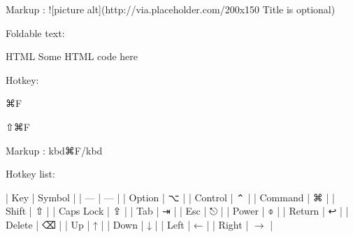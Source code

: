 \documentclass[letterpaper,10pt,english]{sphinxmanual}
\begin{document}
\sphinxAtStartPar
{}

\sphinxAtStartPar


\begin{sphinxVerbatim}[commandchars=\\\{\}]
Markup : ![picture alt](http://via.placeholder.com/200x150 \PYGZdq{}Title is optional\PYGZdq{})
\end{sphinxVerbatim}

\sphinxAtStartPar
Foldable text:



\begin{sphinxVerbatim}[commandchars=\\\{\}]
  
            
                    
\end{sphinxVerbatim}

\begin{sphinxVerbatim}[commandchars=\\\{\}]
HTML
 Some HTML code here 
\end{sphinxVerbatim}

\sphinxAtStartPar
Hotkey:

\sphinxAtStartPar
⌘F

\sphinxAtStartPar
⇧⌘F

\begin{sphinxVerbatim}[commandchars=\\\{\}]
Markup : \PYGZlt{}kbd\PYGZgt{}⌘F\PYGZlt{}/kbd\PYGZgt{}
\end{sphinxVerbatim}

\sphinxAtStartPar
Hotkey list:

\sphinxAtStartPar
| Key | Symbol |
| — | — |
| Option | ⌥ |
| Control | ⌃ |
| Command | ⌘ |
| Shift | ⇧ |
| Caps Lock | ⇪ |
| Tab | ⇥ |
| Esc | ⎋ |
| Power | ⌽ |
| Return | ↩ |
| Delete | ⌫ |
| Up | ↑ |
| Down | ↓ |
| Left | ← |
| Right | \(\rightarrow\) |
\end{document}
